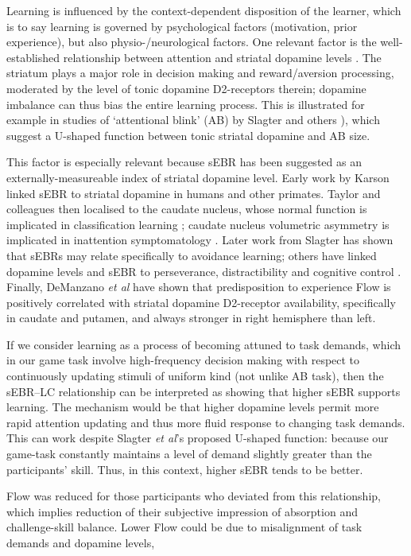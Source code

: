 \documentclass[fleqn,10pt]{wlscirep}
\begin{document}
Learning is influenced by the context-dependent disposition of the learner, which is to say learning is governed by psychological factors (motivation, prior experience), but also physio-/neurological factors. One relevant factor is the well-established relationship between attention and striatal dopamine levels \cite{Dreisbach2005}. The striatum plays a major role in decision making and reward/aversion processing, moderated by the level of tonic dopamine D2-receptors therein; dopamine imbalance can thus bias the entire learning process. This is illustrated for example in studies of `attentional blink' (AB) by Slagter and others \cite{Slagter2012,COLZATO2008}), which suggest a U-shaped function between tonic striatal dopamine and AB size.

This factor is especially relevant because sEBR has been suggested as an externally-measureable index of striatal dopamine level. Early work by Karson \cite{Karson1983} linked sEBR to striatal dopamine in humans and other primates. Taylor and colleagues \cite{Taylor1999} then localised to the caudate nucleus, whose normal function is implicated in classification learning \cite{Seger2005}; caudate nucleus volumetric asymmetry is implicated in inattention symptomatology \cite{Schrimsher2002}. Later work from Slagter \cite{Slagter2015} has shown that sEBRs may relate specifically to avoidance learning; others have linked dopamine levels and sEBR to perseverance, distractibility and cognitive control \cite{Muller2007,Dreisbach2005}. Finally, DeManzano {\it et al} \cite{DeManzano2013} have shown that  predisposition to experience Flow is positively correlated with striatal dopamine D2-receptor availability, specifically in caudate and putamen, and always stronger in right hemisphere than left.

If we consider learning as a process of becoming attuned to task demands, which in our game task involve high-frequency decision making with respect to continuously updating stimuli of uniform kind (not unlike AB task), then the sEBR--LC relationship can be interpreted as showing that higher sEBR supports learning. The mechanism would be that higher dopamine levels permit more rapid attention updating and thus more fluid response to changing task demands. This can work despite Slagter {\it et al}'s \cite{Slagter2012} proposed U-shaped function: because our game-task constantly maintains a level of demand slightly greater than the participants' skill. Thus, in this context, higher sEBR tends to be better.

Flow was reduced for those participants who deviated from this relationship, which implies reduction of their subjective impression of absorption and challenge-skill balance. Lower Flow could be due to misalignment of task demands and dopamine levels, %
\end{document}
